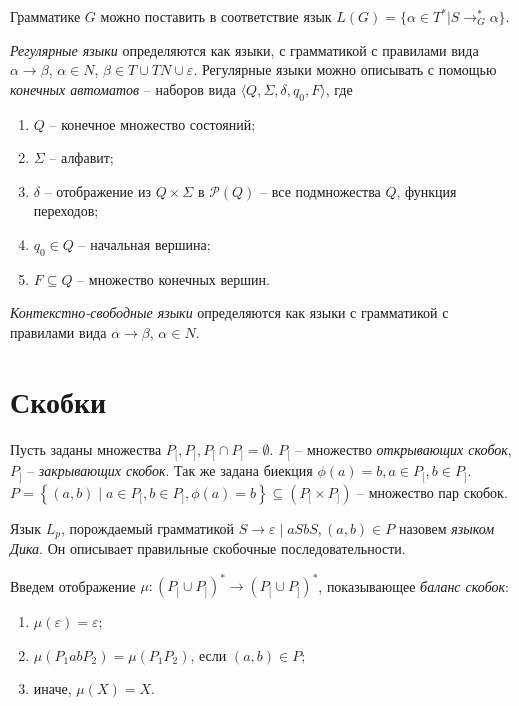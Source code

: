 Грамматике $G$ можно поставить в соответствие язык $L(G) = \{ \alpha \in T^* | S \rightarrow_G^* \alpha \}$. 

\emph{Регулярные языки} определяются как языки, с грамматикой с правилами вида $\alpha \rightarrow \beta$, $\alpha \in N$, $\beta \in T \cup TN \cup \varepsilon$.
Регулярные языки можно описывать с помощью \emph{конечных автоматов} -- наборов вида $\langle Q, \Sigma, \delta, q_0, F \rangle$, где
\begin{enumerate}[label=\arabic*)]
    \item $Q$ -- конечное множество состояний;
    \item $\Sigma$ -- алфавит;
    \item $\delta$ -- отображение из $Q \times \Sigma$ в $\mathcal{P} (Q)$ -- все подмножества $Q$, функция переходов;
    \item $q_0 \in Q$ -- начальная вершина;
    \item $F \subseteq Q$ -- множество конечных вершин.
\end{enumerate}

\emph{Контекстно-свободные языки} определяются как языки с грамматикой с правилами вида $\alpha \rightarrow \beta$, $\alpha \in N$. 

\section{Скобки}


Пусть заданы множества $P_[, P_], P_[ \cap P_] = \emptyset$. 
$P_[$ -- множество \emph{открывающих скобок}, $P_]$ -- \emph{закрывающих скобок}.
Так же задана биекция $\phi(a) = b, a \in P_[, b \in P_]$.
$P = \left\{ (a, b) \mid a \in P_[, b \in P_], \phi(a) = b \right\} \subseteq \left( P_[ \times P_] \right)$ -- множество пар скобок.

Язык $L_p$, порождаемый грамматикой $S \rightarrow \varepsilon \mid a S b S, (a, b) \in P$ назовем \emph{языком Дика}. 
Он описывает правильные скобочные последовательности.

Введем отображение $\mu : (P_[ \cup P_])^* \to (P_[ \cup P_])^* $, показывающее \emph{баланс скобок}:
\begin{enumerate}[label=\arabic*)]
    \item $\mu(\varepsilon) = \varepsilon$;
    \item $\mu(P_1 a b P_2) = \mu(P_1 P_2)$, если $(a, b) \in P$;
    \item иначе, $\mu(X) = X$.
\end{enumerate}

